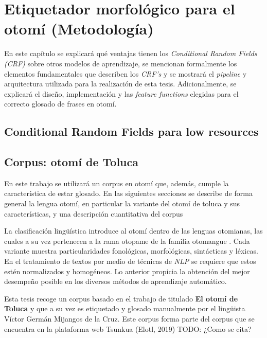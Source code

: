 \documentclass[letterpaper,12pt,oneside]{book}
\begin{document}
\chapter{Etiquetador morfológico para el otomí (Metodología)}

En este capítulo se explicará qué ventajas tienen los \emph{Conditional Random Fields (CRF)} sobre otros modelos de aprendizaje, se mencionan formalmente los elementos fundamentales que describen los \emph{CRF's} y se mostrará el \textit{pipeline} y arquitectura utilizada para la realización de esta tesis. Adicionalmente, se explicará el diseño, implementación y las \textit{feature functions} elegidas para el correcto glosado de frases en otomí.


\section{Conditional Random Fields para low resources}

\section{Corpus: otomí de Toluca}

En este trabajo se utilizará un corpus en otomí que, además, cumple la característica de estar glosado. En las siguientes secciones se describe de forma general la lengua otomí, en particular la variante del otomí de toluca y sus características, y una descripción cuantitativa del corpus

La clasificación lingüística introduce al otomí dentro de las lenguas otomianas, las cuales a su vez pertenecen a la rama otopame de la familia otomangue \citep{barrientos2004otomies}. Cada variante muestra particularidades fonológicas, morfológicas, sintácticas y léxicas. En el tratamiento de textos por medio de técnicas de \textit{NLP} se requiere que estos estén normalizados y homogéneos. Lo anterior propicia la obtención del mejor desempeño posible en los diversos métodos de aprendizaje automático. 

Esta tesis recoge un corpus basado en el trabajo de \citet{lastra1992otomi} titulado \textbf{El otomí de Toluca} y que a su vez es etiquetado y glosado manualmente por el lingüista Víctor Germán Mijangos de la Cruz. Este corpus forma parte del corpus que se encuentra en la plataforma web Tsunkua (Elotl, 2019) TODO: ¿Como se cita?
\end{document}
